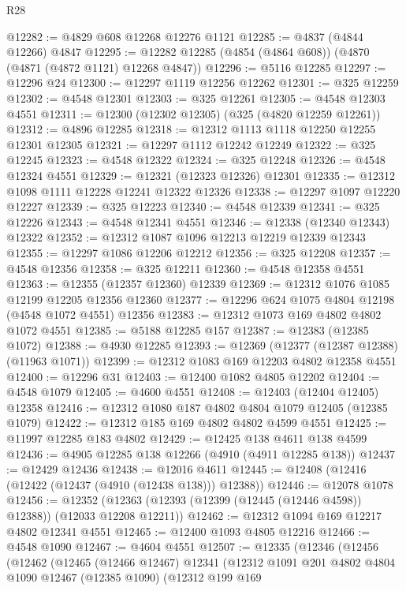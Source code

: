 \begin{lexlean}{R28}
\begin{coremodule}
@12282 := @4829 @608 @12268 @12276 @1121
@12285 := @4837 (@4844 @12266) @4847
@12295 := @12282 @12285 (@4854 (@4864 @608)) (@4870 (@4871 (@4872 @1121) @12268 @4847))
@12296 := @5116 @12285
@12297 := @12296 @24
@12300 := @12297 @1119 @12256 @12262
@12301 := @325 @12259
@12302 := @4548 @12301
@12303 := @325 @12261
@12305 := @4548 @12303 @4551
@12311 := @12300 (@12302 @12305) (@325 (@4820 @12259 @12261))
@12312 := @4896 @12285
@12318 := @12312 @1113 @1118 @12250 @12255 @12301 @12305
@12321 := @12297 @1112 @12242 @12249
@12322 := @325 @12245
@12323 := @4548 @12322
@12324 := @325 @12248
@12326 := @4548 @12324 @4551
@12329 := @12321 (@12323 @12326) @12301
@12335 := @12312 @1098 @1111 @12228 @12241 @12322 @12326
@12338 := @12297 @1097 @12220 @12227
@12339 := @325 @12223
@12340 := @4548 @12339
@12341 := @325 @12226
@12343 := @4548 @12341 @4551
@12346 := @12338 (@12340 @12343) @12322
@12352 := @12312 @1087 @1096 @12213 @12219 @12339 @12343
@12355 := @12297 @1086 @12206 @12212
@12356 := @325 @12208
@12357 := @4548 @12356
@12358 := @325 @12211
@12360 := @4548 @12358 @4551
@12363 := @12355 (@12357 @12360) @12339
@12369 := @12312 @1076 @1085 @12199 @12205 @12356 @12360
@12377 := @12296 @624 @1075 @4804 @12198 (@4548 @1072 @4551) @12356
@12383 := @12312 @1073 @169 @4802 @4802 @1072 @4551
@12385 := @5188 @12285 @157
@12387 := @12383 (@12385 @1072)
@12388 := @4930 @12285
@12393 := @12369 (@12377 (@12387 @12388) (@11963 @1071))
@12399 := @12312 @1083 @169 @12203 @4802 @12358 @4551
@12400 := @12296 @31
@12403 := @12400 @1082 @4805 @12202
@12404 := @4548 @1079
@12405 := @4600 @4551
@12408 := @12403 (@12404 @12405) @12358
@12416 := @12312 @1080 @187 @4802 @4804 @1079 @12405 (@12385 @1079)
@12422 := @12312 @185 @169 @4802 @4802 @4599 @4551
@12425 := @11997 @12285 @183 @4802
@12429 := @12425 @138 @4611 @138 @4599
@12436 := @4905 @12285 @138 @12266 (@4910 (@4911 @12285 @138))
@12437 := @12429 @12436
@12438 := @12016 @4611
@12445 := @12408 (@12416 (@12422 (@12437 (@4910 (@12438 @138))) @12388))
@12446 := @12078 @1078
@12456 := @12352 (@12363 (@12393 (@12399 (@12445 (@12446 @4598)) @12388)) (@12033 @12208 @12211))
@12462 := @12312 @1094 @169 @12217 @4802 @12341 @4551
@12465 := @12400 @1093 @4805 @12216
@12466 := @4548 @1090
@12467 := @4604 @4551
@12507 := @12335
    (@12346
      (@12456
        (@12462
          (@12465
            (@12466 @12467)
            @12341
            (@12312
              @1091
              @201
              @4802
              @4804
              @1090
              @12467
              (@12385 @1090)
              (@12312
                @199
                @169

\end{coremodule}
\end{lexlean}
